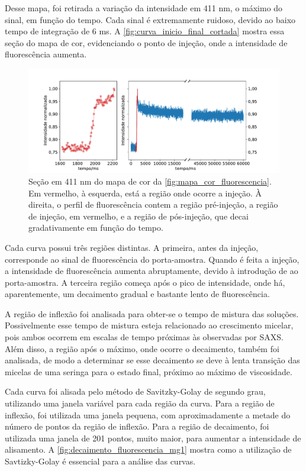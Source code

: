 	Desse mapa, foi retirada a variação da intensidade em 411 nm, o máximo do sinal, em função do tempo. Cada sinal é extremamente ruidoso, devido ao baixo tempo de integração de 6 ms.
	A \autoref{fig:curva_inicio_final_cortada} mostra essa seção do mapa de cor, evidenciando o ponto de injeção, onde a intensidade de fluorescência aumenta.
	
	\begin{figure}[h]
		\centering
		\includegraphics[width=\textwidth]{imagens/fluor/curva_inicio_final_cortada}
		\caption{Seção em 411 nm do mapa de cor da  \autoref{fig:mapa_cor_fluorescencia}. Em vermelho, à esquerda, está a região onde ocorre a injeção. À direita, o perfil de fluorescência contem a região pré-injeção, a região de injeção, em vermelho, e a região de pós-injeção, que decai gradativamente em função do tempo.}
		\label{fig:curva_inicio_final_cortada} 
	\end{figure}
	
	Cada curva possui três regiões distintas. A primeira, antes da injeção, corresponde ao sinal de fluorescência do porta-amostra. Quando é feita a injeção, a intensidade de fluorescência aumenta abruptamente, devido à introdução de \TTAB{} ao porta-amostra. A terceira região começa após o pico de intensidade, onde há, aparentemente, um decaimento gradual e bastante lento de fluorescência.
	
	A região de inflexão foi analisada para obter-se o tempo de mistura das soluções. Possivelmente esse tempo de mistura esteja relacionado ao crescimento micelar, pois ambos ocorrem em escalas de tempo próximas às observadas por SAXS. Além disso, a região após o máximo, onde ocorre o decaimento, também foi analisada, de modo a determinar se esse decaimento se deve à lenta transição das micelas de uma seringa para o estado final, próximo ao máximo de viscosidade. 
	
	Cada curva foi alisada pelo método de Savitzky-Golay de segundo grau, utilizando uma janela variável para cada região da curva. Para a região de inflexão, foi utilizada uma janela pequena, com aproximadamente a metade do número de pontos da região de inflexão. Para a região de decaimento, foi utilizada uma janela de 201 pontos, muito maior, para aumentar a intensidade de alisamento. A \autoref{fig:decaimento_fluorescencia_mg1} mostra como a utilização de Savtizky-Golay é essencial para a análise das curvas. 

